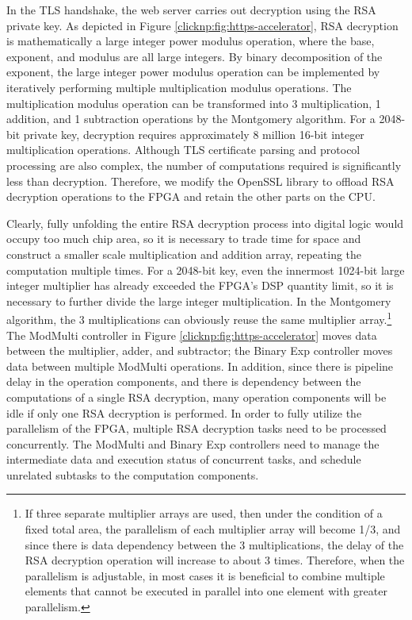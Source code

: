 In the TLS handshake, the web server carries out decryption using the RSA private key. As depicted in Figure \ref{clicknp:fig:https-accelerator}, RSA decryption is mathematically a large integer power modulus operation, where the base, exponent, and modulus are all large integers. By binary decomposition of the exponent, the large integer power modulus operation can be implemented by iteratively performing multiple multiplication modulus operations. The multiplication modulus operation can be transformed into 3 multiplication, 1 addition, and 1 subtraction operations by the Montgomery algorithm. For a 2048-bit private key, decryption requires approximately 8 million 16-bit integer multiplication operations. Although TLS certificate parsing and protocol processing are also complex, the number of computations required is significantly less than decryption. Therefore, we modify the OpenSSL library to offload RSA decryption operations to the FPGA and retain the other parts on the CPU.

Clearly, fully unfolding the entire RSA decryption process into digital logic would occupy too much chip area, so it is necessary to trade time for space and construct a smaller scale multiplication and addition array, repeating the computation multiple times. For a 2048-bit key, even the innermost 1024-bit large integer multiplier has already exceeded the FPGA's DSP quantity limit, so it is necessary to further divide the large integer multiplication. In the Montgomery algorithm, the 3 multiplications can obviously reuse the same multiplier array.\footnote{If three separate multiplier arrays are used, then under the condition of a fixed total area, the parallelism of each multiplier array will become 1/3, and since there is data dependency between the 3 multiplications, the delay of the RSA decryption operation will increase to about 3 times. Therefore, when the parallelism is adjustable, in most cases it is beneficial to combine multiple elements that cannot be executed in parallel into one element with greater parallelism.} The ModMulti controller in Figure \ref{clicknp:fig:https-accelerator} moves data between the multiplier, adder, and subtractor; the Binary Exp controller moves data between multiple ModMulti operations. In addition, since there is pipeline delay in the operation components, and there is dependency between the computations of a single RSA decryption, many operation components will be idle if only one RSA decryption is performed. In order to fully utilize the parallelism of the FPGA, multiple RSA decryption tasks need to be processed concurrently. The ModMulti and Binary Exp controllers need to manage the intermediate data and execution status of concurrent tasks, and schedule unrelated subtasks to the computation components.


